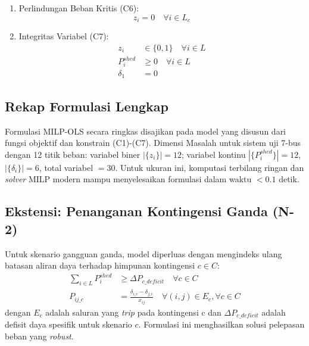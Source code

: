 \begin{enumerate}
\item[f.] Perlindungan Beban Kritis (C6):
\begin{equation}
    z_{i} = 0 \quad \forall i\in L_{c}
\end{equation}

\item[g.] Integritas Variabel (C7):
\begin{equation}
    \begin{aligned}
        z_{i} &\in \{0,1\} \quad \forall i\in L \\
        P_{i}^{shed} &\ge 0 \quad \forall i\in L \\
        \delta_{1} &= 0
    \end{aligned}
\end{equation}
\end{enumerate}

\subsection{Rekap Formulasi Lengkap}
\label{subsec:Rekap_Formulasi_Lengkap}

Formulasi MILP-OLS secara ringkas disajikan pada model yang disusun dari fungsi objektif dan konstrain (C1)-(C7). Dimensi Masalah untuk sistem uji 7-bus dengan 12 titik beban: variabel biner $|\{z_{i}\}|=12$; variabel kontinu $|\{P_{i}^{shed}\}|=12$, $|\{\delta_{i}\}|=6$, total variabel $=30$. Untuk ukuran ini, komputasi terbilang ringan dan \textit{solver} MILP modern mampu menyelesaikan formulasi dalam waktu $<0.1$ detik.

\subsection{Ekstensi: Penanganan Kontingensi Ganda (N-2)}
\label{subsec:Ekstensi_Penanganan_Kontingensi_Ganda}

Untuk skenario gangguan ganda, model diperluas dengan mengindeks ulang batasan aliran daya terhadap himpunan kontingensi $c\in C$:
\begin{equation}
    \begin{aligned}
        \sum_{i\in L} P_{i}^{shed} &\ge \Delta P_{c\_deficit} \quad \forall c\in C \\
        P_{ij\_c} &= \frac{\delta_{i\_c}-\delta_{j\_c}}{x_{ij}} \quad \forall(i,j)\in E_{c}, \forall c\in C
    \end{aligned}
\end{equation}
dengan $E_{c}$ adalah saluran yang \textit{trip} pada kontingensi c dan $\Delta P_{c\_deficit}$ adalah defisit daya spesifik untuk skenario $c$. Formulasi ini menghasilkan solusi pelepasan beban yang \textit{robust}.

